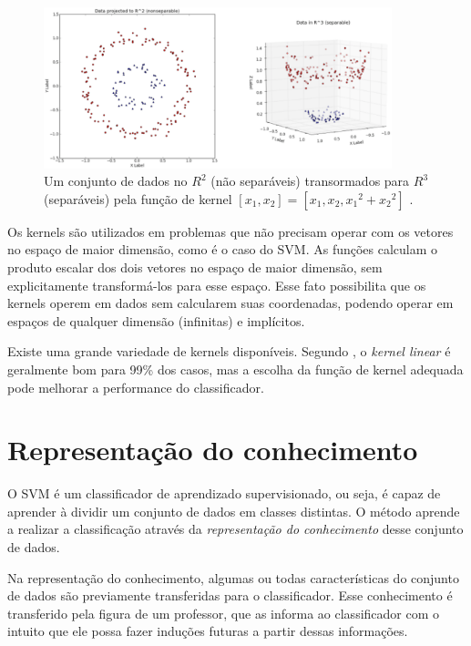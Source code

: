 \begin{figure}[htpb]
	\begin{center}
		\includegraphics[width=0.9\textwidth]{figuras/svm-kernel.eps}
		\caption{Um conjunto de dados no ${R}^{2}$ (não separáveis) transormados para ${R}^{3}$ (separáveis) pela função de kernel $[{x}_{1}, {x}_{2}] = [{x}_{1}, {x}_{2}, {x_1}^{2} + {x_2}^{2}]$ \cite{Kim2013}.}
	\end{center}
\end{figure}

Os kernels são utilizados em problemas que não precisam operar com os vetores no espaço de maior dimensão, como é o caso do SVM. As funções calculam o produto escalar dos dois vetores no espaço de maior dimensão, sem explicitamente transformá-los para esse espaço. Esse fato possibilita que os kernels operem em dados sem calcularem suas coordenadas, podendo operar em espaços de qualquer dimensão (infinitas) e implícitos.

Existe uma grande variedade de kernels disponíveis. Segundo , o \textit{kernel linear} é geralmente bom para 99\% dos casos, mas a escolha da função de kernel adequada pode melhorar a performance do classificador.

\section{Representação do conhecimento}

O SVM é um classificador de aprendizado supervisionado, ou seja, é capaz de aprender à dividir um conjunto de dados em classes distintas. O método aprende a realizar a classificação através da \textit{representação do conhecimento} desse conjunto de dados.

Na representação do conhecimento, algumas ou todas características do conjunto de dados são previamente transferidas para o classificador. Esse conhecimento é transferido pela figura de um professor, que as informa ao classificador com o intuito que ele possa fazer induções futuras a partir dessas informações.


